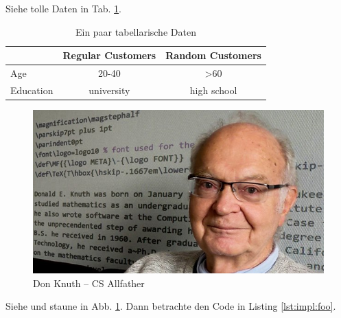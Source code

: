 Siehe tolle Daten in Tab. \ref{tab:impl:data}.

\begin{table}
    \centering
    \begin{tabular}{|lcc|}
    \hline
              & \textbf{Regular Customers} & \textbf{Random Customers} \\ \hline
    Age       & 20-40                      & \textgreater{}60          \\ \hline
    Education & university                 & high school               \\ \hline
    \end{tabular}
    \caption{Ein paar tabellarische Daten}
    \label{tab:impl:data}
\end{table}

\begin{figure}
    \centering
    \includegraphics[scale=0.5]{pics/knuthi.jpg}
    \caption{Don Knuth -- CS Allfather}
    \label{fig:impl:knuth}
\end{figure}

Siehe und staune in Abb. \ref{fig:impl:knuth}.
\lipsum[6-9]
Dann betrachte den Code in Listing \ref{lst:impl:foo}.

